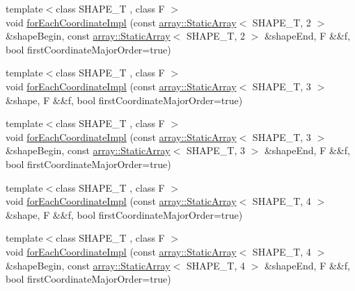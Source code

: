 \begin{DoxyCompactItemize}
\item 
{\footnotesize template$<$class S\+H\+A\+P\+E\+\_\+\+T , class F $>$ }\\void \hyperlink{namespacenifty_1_1tools_a4d10b12dbebf89f9ad6f38e644547778}{for\+Each\+Coordinate\+Impl} (const \hyperlink{namespacenifty_1_1array_a683f151f19c851754e0c6d55ed16a0c2}{array\+::\+Static\+Array}$<$ S\+H\+A\+P\+E\+\_\+\+T, 2 $>$ \&shape\+Begin, const \hyperlink{namespacenifty_1_1array_a683f151f19c851754e0c6d55ed16a0c2}{array\+::\+Static\+Array}$<$ S\+H\+A\+P\+E\+\_\+\+T, 2 $>$ \&shape\+End, F \&\&f, bool first\+Coordinate\+Major\+Order=true)
\item 
{\footnotesize template$<$class S\+H\+A\+P\+E\+\_\+\+T , class F $>$ }\\void \hyperlink{namespacenifty_1_1tools_ade659d2c15de2ffed10783e9f1602e59}{for\+Each\+Coordinate\+Impl} (const \hyperlink{namespacenifty_1_1array_a683f151f19c851754e0c6d55ed16a0c2}{array\+::\+Static\+Array}$<$ S\+H\+A\+P\+E\+\_\+\+T, 3 $>$ \&shape, F \&\&f, bool first\+Coordinate\+Major\+Order=true)
\item 
{\footnotesize template$<$class S\+H\+A\+P\+E\+\_\+\+T , class F $>$ }\\void \hyperlink{namespacenifty_1_1tools_a0d8157dba40263adc2077ffac352ff76}{for\+Each\+Coordinate\+Impl} (const \hyperlink{namespacenifty_1_1array_a683f151f19c851754e0c6d55ed16a0c2}{array\+::\+Static\+Array}$<$ S\+H\+A\+P\+E\+\_\+\+T, 3 $>$ \&shape\+Begin, const \hyperlink{namespacenifty_1_1array_a683f151f19c851754e0c6d55ed16a0c2}{array\+::\+Static\+Array}$<$ S\+H\+A\+P\+E\+\_\+\+T, 3 $>$ \&shape\+End, F \&\&f, bool first\+Coordinate\+Major\+Order=true)
\item 
{\footnotesize template$<$class S\+H\+A\+P\+E\+\_\+\+T , class F $>$ }\\void \hyperlink{namespacenifty_1_1tools_a581fe3925f44b138d984f032f007ea30}{for\+Each\+Coordinate\+Impl} (const \hyperlink{namespacenifty_1_1array_a683f151f19c851754e0c6d55ed16a0c2}{array\+::\+Static\+Array}$<$ S\+H\+A\+P\+E\+\_\+\+T, 4 $>$ \&shape, F \&\&f, bool first\+Coordinate\+Major\+Order=true)
\item 
{\footnotesize template$<$class S\+H\+A\+P\+E\+\_\+\+T , class F $>$ }\\void \hyperlink{namespacenifty_1_1tools_aad393bfeb324d5a484bb50a2dd0ac9fa}{for\+Each\+Coordinate\+Impl} (const \hyperlink{namespacenifty_1_1array_a683f151f19c851754e0c6d55ed16a0c2}{array\+::\+Static\+Array}$<$ S\+H\+A\+P\+E\+\_\+\+T, 4 $>$ \&shape\+Begin, const \hyperlink{namespacenifty_1_1array_a683f151f19c851754e0c6d55ed16a0c2}{array\+::\+Static\+Array}$<$ S\+H\+A\+P\+E\+\_\+\+T, 4 $>$ \&shape\+End, F \&\&f, bool first\+Coordinate\+Major\+Order=true)

\end{DoxyCompactItemize}
